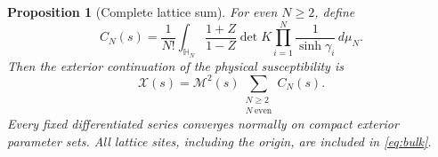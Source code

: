 \documentclass[11pt]{article}
\numberwithin{equation}{section}
\newtheorem{proposition}[theorem]{Proposition}
\theoremstyle{remark}\newtheorem{remark}[theorem]{Remark}
\newcommand{\X}{\mathcal X}
\newcommand{\Mtwo}{\mathcal M^2}
\begin{document}
\begin{proposition}[Complete lattice sum]\label{prop:angular-bulk}
For even $N\ge2$, define
\begin{equation}\label{eq:angular-bulk}
 C_N(s)=\frac1{N!}\int_{\mathbb H_N}
       \frac{1+Z}{1-Z}\det K\prod_{i=1}^N\frac1{\sinh\gamma_i}
                         \,d\mu_N.
\end{equation}
Then the exterior continuation of the physical susceptibility is
\begin{equation}\label{eq:bulk}
 \X(s)=\Mtwo(s)\sum_{\substack{N\ge2\\N\ \mathrm{even}}} C_N(s).
\end{equation}
Every fixed differentiated series converges normally on compact
exterior parameter sets. All lattice sites, including the origin,
are included in \eqref{eq:bulk}.
\end{proposition}
\end{document}
